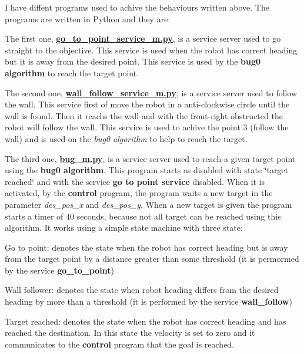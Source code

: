 I have diffent programs used to achive the behaviours written above. The programs are written in Python and they are\+:
\begin{DoxyItemize}
\item The first one, {\bfseries \hyperlink{go__to__point__service__m_8py}{go\+\_\+to\+\_\+point\+\_\+service\+\_\+m.\+py}}, is a service server used to go straight to the objective. This service is used when the robot has correct heading but it is away from the desired point. This service is used by the {\bfseries bug0 algorithm} to reach the target point.
\item The second one, {\bfseries \hyperlink{wall__follow__service__m_8py}{wall\+\_\+follow\+\_\+service\+\_\+m.\+py}}, is a service server used to follow the wall. This service first of move the robot in a anti-\/clockwise circle until the wall is found. Then it reachs the wall and with the front-\/right obstructed the robot will follow the wall. This service is used to achive the point 3 (follow the wall) and is used on the {\itshape bug0 algorithm} to help to reach the target.
\item The third one, {\bfseries \hyperlink{bug__m_8py}{bug\+\_\+m.\+py}}, is a service server used to reach a given target point using the {\bfseries bug0 algorithm}. This program starts as disabled with state \char`\"{}target reached\char`\"{} and with the service {\bfseries go to point service} disabled. When it is activated, by the {\bfseries control} program, the program waits a new target in the parameter {\itshape des\+\_\+pos\+\_\+x} and {\itshape des\+\_\+pos\+\_\+y}. When a new target is given the program starts a timer of 40 seconds, because not all target can be reached using this algorithm. It works using a simple state machine with three state\+:
\begin{DoxyItemize}
\item Go to point\+: denotes the state when the robot has correct heading but is away from the target point by a distance greater than some threshold (it is permormed by the service {\bfseries go\+\_\+to\+\_\+point})
\item Wall follower\+: denotes the state when robot heading differs from the desired heading by more than a threshold (it is performed by the service {\bfseries wall\+\_\+follow})
\item Target reached\+: denotes the state when the robot has correct heading and has reached the destination. In this state the velocity is set to zero and it communicates to the {\bfseries control} program that the goal is reached.

\end{DoxyItemize}
\end{DoxyItemize}
